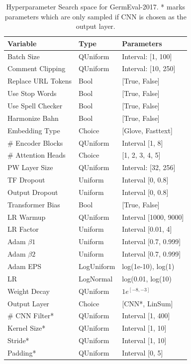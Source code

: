 \begin{table}[]
	\centering
	\begin{tabular}{@{}lll@{}}
	\toprule
	Variable           & Type       & Parameters                \\ \midrule
	Batch Size         & QUniform   & Interval: {[}1, 100{]}    \\
	Comment Clipping   & QUniform   & Interval: {[}10, 250{]}   \\
	Replace URL Tokens & Bool       & {[}True, False{]}         \\
	Use Stop Words     & Bool       & {[}True, False{]}         \\
	Use Spell Checker  & Bool       & {[}True, False{]}         \\
	Harmonize Bahn     & Bool       & {[}True, False{]}         \\
	Embedding Type     & Choice     & {[}Glove, Fasttext{]}     \\
	\# Encoder Blocks  & QUniform   & Interval {[}1, 8{]}       \\
	\# Attention Heads & Choice     & {[}1, 2, 3, 4, 5{]}       \\
	PW Layer Size      & QUniform   & Interval: {[}32, 256{]}   \\
	TF Dropout         & Uniform    & Interval {[}0, 0.8{]}     \\
	Output Dropout     & Uniform    & Interval {[}0, 0.8{]}     \\
	Transformer Bias   & Bool       & {[}True, False{]}         \\
	LR Warmup          & QUniform   & Interval {[}1000, 9000{]} \\
	LR Factor          & Uniform    & Interval {[}0.01, 4{]}    \\
	Adam $\beta 1$        & Uniform    & Interval {[}0.7, 0.999{]} \\
	Adam $\beta 2$        & Uniform    & Interval {[}0.7, 0.999{]} \\
	Adam EPS           & LogUniform & log(1e-10), log(1)        \\
	LR                 & LogNormal  & log(0.01, log(10)         \\
	Weight Decay       & QUniform   & $1e^{[-8, -3]}$       \\
	Output Layer       & Choice     & {[}CNN*, LinSum{]}        \\
	\# CNN Filter*     & QUniform   & Interval {[}1, 400{]}     \\
	Kernel Size*       & QUniform   & Interval {[}1, 10{]}      \\
	Stride*            & QUniform   & Interval {[}1, 10{]}      \\
	Padding*           & QUniform   & Interval {[}0, 5{]}       \\ \bottomrule
	\end{tabular}
	\caption{Hyperparameter Search space for GermEval-2017. * marks parameters which are only sampled if CNN is chosen as the output layer.}
	\label{tab:08_hpSpace}	
\end{table}

